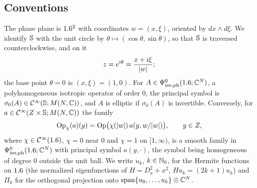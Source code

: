 \subsection{Conventions}
The phase plane is $1.6^2$ with coordinates $w=(x,\xi)$, oriented by $dx\wedge d\xi$.
We identify $\mathbb{S}$ with the unit circle by $\theta\mapsto(\cos\theta,\sin\theta)$, so
that $\mathbb{S}$ is traversed counterclockwise, and on it
\begin{equation*}
  z=e^{i\theta}=\frac{x+i\xi}{\lvert w\rvert};
\end{equation*}
the base point $\theta=0$ is $(x,\xi)=(1,0)$. For $A\in\Psi^{0}_{\mathrm{iso,ph}}(1.6;\mathbb{C}^N)$, a
polyhomogeneous isotropic operator of order $0$, the principal symbol is
$\sigma_0(A)\in\mathcal{C}^\infty(\mathbb{S};M(N,\mathbb{C}))$, and $A$ is elliptic if $\sigma_0(A)$ is invertible.
Conversely, for $a\in\mathcal{C}^\infty(Z\times\mathbb{S};M(N,\mathbb{C}))$ the family
\begin{equation}\label{bott:eq:iso-quantize}
  \operatorname{Op}_\chi(a)(y)=\operatorname{Op}\bigl(\chi(\lvert w\rvert)\,a(y,w/\lvert w\rvert)\bigr),\qquad y\in Z,
\end{equation}
where $\chi\in\mathcal{C}^\infty(1.6)$, $\chi=0$ near $0$ and $\chi=1$ on $[1,\infty)$,
is a smooth family in $\Psi^{0}_{\mathrm{iso,ph}}(1.6;\mathbb{C}^N)$ with principal symbol $a(y,\cdot)$, the
symbol being homogeneous of degree $0$ outside the unit ball. We write
$u_k$, $k\in\mathbb{N}_0$, for the Hermite functions on $1.6$ (the normalized eigenfunctions of
$H=D_x^2+x^2$, $Hu_k=(2k+1)u_k$) and $\Pi_k$ for the orthogonal projection onto
$\operatorname{span}\{u_0,\dots,u_k\}\otimes\mathbb{C}^N$.

